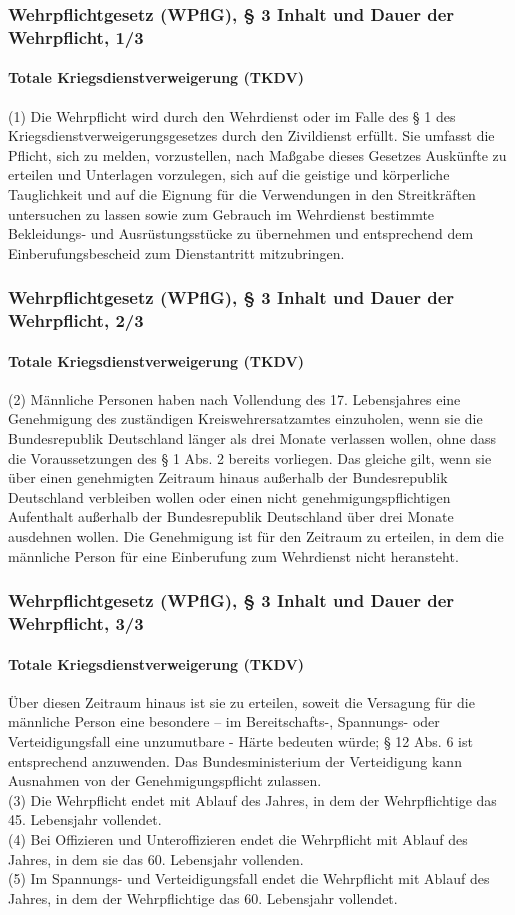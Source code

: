 \documentclass{beamer}
\begin{document}
	\begin{frame}
		\frametitle{Wehrpflichtgesetz (WPflG), § 3 Inhalt und Dauer der Wehrpflicht, 1/3}
		\framesubtitle{Totale Kriegsdienstverweigerung (TKDV)}
		(1) Die Wehrpflicht wird durch den Wehrdienst oder im Falle des § 1 des Kriegsdienstverweigerungsgesetzes durch den Zivildienst erfüllt. Sie umfasst die Pflicht, sich zu melden, vorzustellen, nach Maßgabe dieses Gesetzes Auskünfte zu erteilen und Unterlagen vorzulegen, sich auf die geistige und körperliche Tauglichkeit und auf die Eignung für die Verwendungen in den Streitkräften untersuchen zu lassen sowie zum Gebrauch im Wehrdienst bestimmte Bekleidungs- und Ausrüstungsstücke zu übernehmen und entsprechend dem Einberufungsbescheid zum Dienstantritt mitzubringen.\\
	\end{frame}
	
	\begin{frame}
		\frametitle{Wehrpflichtgesetz (WPflG), § 3 Inhalt und Dauer der Wehrpflicht, 2/3}
		\framesubtitle{Totale Kriegsdienstverweigerung (TKDV)}
		(2) Männliche Personen haben nach Vollendung des 17. Lebensjahres eine Genehmigung des zuständigen Kreiswehrersatzamtes einzuholen, wenn sie die Bundesrepublik Deutschland länger als drei Monate verlassen wollen, ohne dass die Voraussetzungen des § 1 Abs. 2 bereits vorliegen. Das gleiche gilt, wenn sie über einen genehmigten Zeitraum hinaus außerhalb der Bundesrepublik Deutschland verbleiben wollen oder einen nicht genehmigungspflichtigen Aufenthalt außerhalb der Bundesrepublik Deutschland über drei Monate ausdehnen wollen. Die Genehmigung ist für den Zeitraum zu erteilen, in dem die männliche Person für eine Einberufung zum Wehrdienst nicht heransteht.
	\end{frame}
	
	\begin{frame}
		\frametitle{Wehrpflichtgesetz (WPflG), § 3 Inhalt und Dauer der Wehrpflicht, 3/3}
		\framesubtitle{Totale Kriegsdienstverweigerung (TKDV)}
		 Über diesen Zeitraum hinaus ist sie zu erteilen, soweit die Versagung für die männliche Person eine besondere – im Bereitschafts-, Spannungs- oder Verteidigungsfall eine unzumutbare - Härte bedeuten würde; § 12 Abs. 6 ist entsprechend anzuwenden. Das Bundesministerium der Verteidigung kann Ausnahmen von der Genehmigungspflicht zulassen.\\
		(3) Die Wehrpflicht endet mit Ablauf des Jahres, in dem der Wehrpflichtige das 45. Lebensjahr vollendet.\\		
		(4) Bei Offizieren und Unteroffizieren endet die Wehrpflicht mit Ablauf des Jahres, in dem sie das 60. Lebensjahr vollenden.\\		
		(5) Im Spannungs- und Verteidigungsfall endet die Wehrpflicht mit Ablauf des Jahres, in dem der Wehrpflichtige das 60. Lebensjahr vollendet.
	\end{frame}
	
\end{document}

